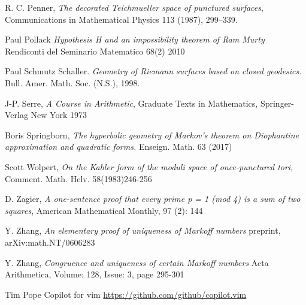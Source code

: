 \documentclass[12pt,a4paper]{amsart}
\begin{document}
R. C. Penner, 
\textit{The decorated Teichmueller space of punctured surfaces}, 
Communications in Mathematical Physics 113 (1987), 299–339.

Paul Pollack
\textit{ Hypothesis H and an impossibility theorem of Ram Murty }
Rendiconti del Seminario Matematico 68(2) 2010

 Paul Schmutz Schaller. 
 \textit{Geometry of Riemann surfaces based on closed geodesics.}
 Bull. Amer. Math. Soc. (N.S.),  1998.

J-P. Serre,
\textit{A Course in Arithmetic},
Graduate Texts in Mathematics,
Springer-Verlag New York
1973

Boris Springborn, 
\textit{The hyperbolic geometry of Markov’s theorem on Diophantine
approximation and quadratic forms.} Enseign. Math. 63 (2017)

Scott Wolpert,
\textit{On the Kahler form of the moduli space of once-punctured tori}, 
Comment. Math. Helv. 58(1983)246-256

D. Zagier,
 \textit{A one-sentence proof that every prime p = 1 (mod 4) is a sum of two squares}, 
 American Mathematical Monthly, 97 (2): 144
 
 Y. Zhang,
 \textit{ An elementary proof of uniqueness of Markoff numbers}
 preprint, arXiv:math.NT/0606283
 
   Y. Zhang,
 \textit{Congruence and uniqueness of certain Markoff numbers}
 Acta Arithmetica, Volume: 128, Issue: 3, page 295-301


  Tim Pope Copilot for vim
   \url{https://github.com/github/copilot.vim}

%

%
%
%
%
%
%
%



% 
 
\end{document}
